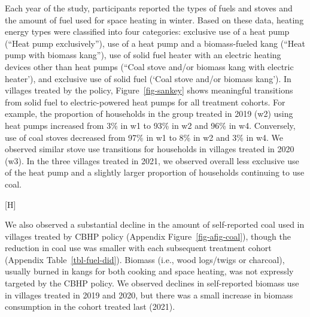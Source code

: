 \documentclass[
  letterpaper,
  DIV=11,
  numbers=noendperiod]{scrartcl}
\makeatletter
\renewenvironment{figure}%
   {\renewcommand\familydefault\sfdefault
    \@float{figure}}
   {\end@float}
\providecommand{\DIFaddbeginFL}{} %
\providecommand{\DIFaddendFL}{} %
\providecommand{\DIFdelbeginFL}{} %
\providecommand{\DIFdelendFL}{} %
\newcommand{\DIFscaledelfig}{0.5}
\newlength{\DIFdelgraphicswidth} %
\newlength{\DIFdelgraphicsheight} %
\newcommand{\DIFaddincludegraphics}[2][]{{\color{blue}\fbox{\DIFOincludegraphics[#1]{#2}}}} %
\newcommand{\DIFdelincludegraphics}[2][]{%
\sbox{\DIFdelgraphicsbox}{\DIFOincludegraphics[#1]{#2}}%
\settoboxwidth{\DIFdelgraphicswidth}{\DIFdelgraphicsbox} %
\settoboxtotalheight{\DIFdelgraphicsheight}{\DIFdelgraphicsbox} %
\scalebox{\DIFscaledelfig}{%
\parbox[b]{\DIFdelgraphicswidth}{\usebox{\DIFdelgraphicsbox}\\[-\baselineskip] \rule{\DIFdelgraphicswidth}{0em}}\llap{\resizebox{\DIFdelgraphicswidth}{\DIFdelgraphicsheight}{%
\setlength{\unitlength}{\DIFdelgraphicswidth}%
\begin{picture}(1,1)%
\thicklines\linethickness{2pt} %
{\color[rgb]{1,0,0}\put(0,0){\framebox(1,1){}}}%
{\color[rgb]{1,0,0}\put(0,0){\line( 1,1){1}}}%
{\color[rgb]{1,0,0}\put(0,1){\line(1,-1){1}}}%
\end{picture}%
}\hspace*{3pt}}} %
} %
\DeclareRobustCommand{\DIFaddbeginFL}{\DIFOaddbeginFL \let\includegraphics\DIFaddincludegraphics} %
\DeclareRobustCommand{\DIFaddendFL}{\DIFOaddendFL \let\includegraphics\DIFOincludegraphics} %
\DeclareRobustCommand{\DIFdelbeginFL}{\DIFOdelbeginFL \let\includegraphics\DIFdelincludegraphics} %
\DeclareRobustCommand{\DIFdelendFL}{\DIFOaddendFL \let\includegraphics\DIFOincludegraphics} %
\makeatother
\begin{document}
Each year of the study, participants reported the types of fuels and
stoves and the amount of fuel used for space heating in winter. Based on
these data, heating energy types were classified into four categories:
exclusive use of a heat pump (``Heat pump exclusively''), use of a heat
pump and a biomass-fueled kang (``Heat pump with biomass kang''), use of
solid fuel heater with an electric heating devices other than heat pumps
(``Coal stove and/or biomass kang with electric heater'), and exclusive
use of solid fuel (`Coal stove and/or biomass kang'). In villages
treated by the policy, Figure~\ref{fig-sankey} shows meaningful
transitions from solid fuel to electric-powered heat pumps for all
treatment cohorts. For example, the proportion of households in the
group treated in 2019 (w2) using heat pumps increased from 3\% in w1 to
93\% in w2 and 96\% in w4. Conversely, use of coal stoves decreased from
97\% in w1 to 8\% in w2 and 3\% in w4. We observed similar stove use
transitions for households in villages treated in 2020 (w3). In the
three villages treated in 2021, we observed overall less exclusive use
of the heat pump and a slightly larger proportion of households
continuing to use coal.

\begin{figure}[H]

\DIFdelbeginFL %
\DIFdelendFL \DIFaddbeginFL {}
\DIFaddendFL 

\DIFdelbeginFL %

\DIFdelendFL \caption{\label{fig-sankey}Transitions to different energy sources
across study waves}

\end{figure}%

We also observed a substantial decline in the amount of self-reported
coal used in villages treated by CBHP policy (Appendix
Figure~\ref{fig-afig-coal}), though the reduction in coal use was
smaller with each subsequent treatment cohort (Appendix
Table~\ref{tbl-fuel-did}). Biomass (i.e., wood logs/twigs or charcoal),
usually burned in kangs for both cooking and space heating, was not
expressly targeted by the CBHP policy. We observed declines in
self-reported biomass use in villages treated in 2019 and 2020, but
there was a small increase in biomass consumption in the cohort treated
last (2021).
\end{document}
